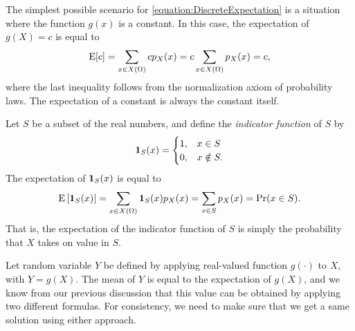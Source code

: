 \begin{example}
The simplest possible scenario for \eqref{equation:DiscreteExpectation} is a situation where the function $g(x)$ is a constant.
In this case, the expectation of $g(X) = c$ is equal to
\begin{equation*}
\mathrm{E} [ c ]
= \sum_{x \in X(\Omega)} c p_X (x)
= c \sum_{x \in X(\Omega)} p_X (x)
= c,
\end{equation*}
where the last inequality follows from the normalization axiom of probability laws.
The expectation of a constant is always the constant itself.
\end{example}

\begin{example}
Let $S$ be a subset of the real numbers, and define the \emph{indicator function} of $S$ by 
\begin{equation*}
\mathbf{1}_S (x) = \begin{cases} 1, & x \in S\\
0, & x \notin S . \end{cases}
\end{equation*}
The expectation of $\mathbf{1}_S (x)$ is equal to
\begin{equation*}
\mathrm{E} \left[ \mathbf{1}_S (x) \right]
= \sum_{x \in X(\Omega)} \mathbf{1}_S (x) p_X(x)
= \sum_{x \in S} p_X(x)
= \Pr (x \in S) .
\end{equation*}
That is, the expectation of the indicator function of $S$ is simply the probability that $X$ takes on value in $S$.
\end{example}

Let random variable $Y$ be defined by applying real-valued function $g(\cdot)$ to $X$, with $Y = g(X)$.
The mean of $Y$ is equal to the expectation of $g(X)$, and we know from our previous discussion that this value can be obtained by applying two different formulas.
For consistency, we need to make sure that we get a same solution using either approach.


